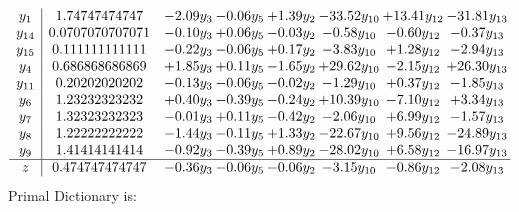 \documentclass[9pt]{article}
\begin{document}
\[\begin{array}{c| c c@{\hskip 2pt} c@{\hskip 2pt} c@{\hskip 2pt} c@{\hskip 2pt} c@{\hskip 2pt} c@{\hskip 2pt} }
 y_{1}   &  1.74747474747 & -2.09 y_{3} & -0.06 y_{5} & +  1.39 y_{2} & -33.52 y_{10} & + 13.41 y_{12} & -31.81 y_{13}\\
 y_{14}   &  0.0707070707071 & -0.10 y_{3} & +  0.06 y_{5} & -0.03 y_{2} & -0.58 y_{10} & -0.60 y_{12} & -0.37 y_{13}\\
 y_{15}   &  0.111111111111 & -0.22 y_{3} & -0.06 y_{5} & +  0.17 y_{2} & -3.83 y_{10} & +  1.28 y_{12} & -2.94 y_{13}\\
 y_{4}   &  0.686868686869 & +  1.85 y_{3} & +  0.11 y_{5} & -1.65 y_{2} & + 29.62 y_{10} & -2.15 y_{12} & + 26.30 y_{13}\\
 y_{11}   &  0.20202020202 & -0.13 y_{3} & -0.06 y_{5} & -0.02 y_{2} & -1.29 y_{10} & +  0.37 y_{12} & -1.85 y_{13}\\
 y_{6}   &  1.23232323232 & +  0.40 y_{3} & -0.39 y_{5} & -0.24 y_{2} & + 10.39 y_{10} & -7.10 y_{12} & +  3.34 y_{13}\\
 y_{7}   &  1.32323232323 & -0.01 y_{3} & +  0.11 y_{5} & -0.42 y_{2} & -2.06 y_{10} & +  6.99 y_{12} & -1.57 y_{13}\\
 y_{8}   &  1.22222222222 & -1.44 y_{3} & -0.11 y_{5} & +  1.33 y_{2} & -22.67 y_{10} & +  9.56 y_{12} & -24.89 y_{13}\\
 y_{9}   &  1.41414141414 & -0.92 y_{3} & -0.39 y_{5} & +  0.89 y_{2} & -28.02 y_{10} & +  6.58 y_{12} & -16.97 y_{13}\\
\hline
z    &  0.474747474747 & -0.36 y_{3} & -0.06 y_{5} & -0.06 y_{2} & -3.15 y_{10} & -0.86 y_{12} & -2.08 y_{13}\\
\end{array}\]
Primal Dictionary is:
\end{document}
